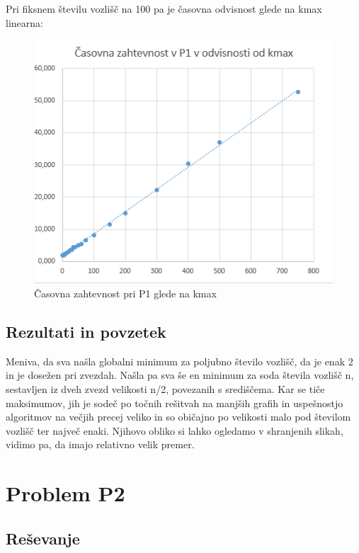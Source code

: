 \documentclass[a4paper, 12 pt]{article}
\begin{document}
\vspace{1cm}

Pri fiksnem številu vozlišč na 100 pa je časovna odvisnost glede na kmax linearna:

\begin{figure}[H]
\centering
  \includegraphics[width=12cm]{casovna_p1_kmax.png}
  \caption{Časovna zahtevnost pri P1 glede na kmax}
  \label{fig:p1_časovna_zaht_kmax} 
\end{figure}

\vspace{1cm}


\subsection{Rezultati in povzetek}

Meniva, da sva našla globalni minimum za poljubno število vozlišč, da je enak 2 in je dosežen pri zvezdah. Našla pa sva še en minimum za soda števila vozlišč n, sestavljen iz dveh zvezd velikosti n/2, povezanih s središčema. Kar se tiče maksimumov, jih je sodeč po točnih rešitvah na manjših grafih in uspešnostjo algoritmov na večjih precej veliko in so običajno po velikosti malo pod številom vozlišč ter največ enaki. Njihovo obliko si lahko ogledamo v shranjenih slikah, vidimo pa, da imajo relativno velik premer.

\pagebreak

\section{Problem P2}

\subsection{Reševanje}
\end{document}

